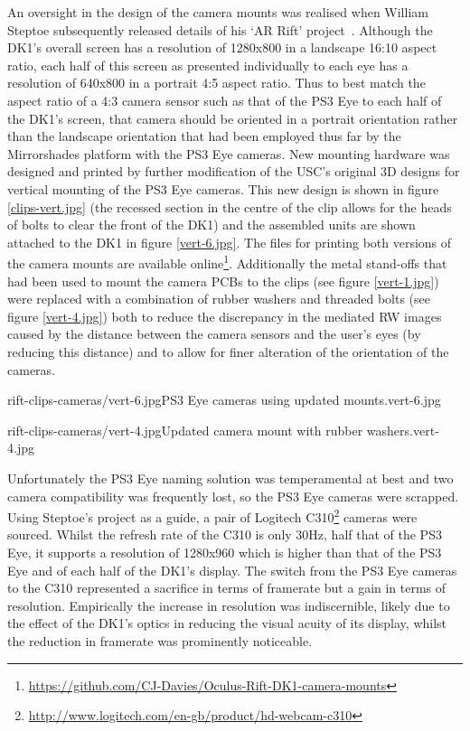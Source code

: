 An oversight in the design of the camera mounts was realised when William Steptoe subsequently released details of his `AR Rift' project~\cite{Steptoe2014}. Although the DK1's overall screen has a resolution of 1280x800 in a landscape 16:10 aspect ratio, each half of this screen as presented individually to each eye has a resolution of 640x800 in a portrait 4:5 aspect ratio. Thus to best match the aspect ratio of a 4:3 camera sensor such as that of the PS3 Eye to each half of the DK1's screen, that camera should be oriented in a portrait orientation rather than the landscape orientation that had been employed thus far by the Mirrorshades platform with the PS3 Eye cameras. New mounting hardware was designed and printed by further modification of the USC's original 3D designs for vertical mounting of the PS3 Eye cameras. This new design is shown in figure \ref{clips-vert.jpg} (the recessed section in the centre of the clip allows for the heads of bolts to clear the front of the DK1) and the assembled units are shown attached to the DK1 in figure \ref{vert-6.jpg}. The files for printing both versions of the camera mounts are available online\footnote{\url{https://github.com/CJ-Davies/Oculus-Rift-DK1-camera-mounts}}. Additionally the metal stand-offs that had been used to mount the camera PCBs to the clips (see figure \ref{vert-1.jpg}) were replaced with a combination of rubber washers and threaded bolts (see figure \ref{vert-4.jpg}) both to reduce the discrepancy in the mediated RW images caused by the distance between the camera sensors and the user's eyes (by reducing this distance) and to allow for finer alteration of the orientation of the cameras.

       {rift-clips-cameras/vert-6.jpg}{PS3 Eye cameras using updated mounts.}{vert-6.jpg}

       {rift-clips-cameras/vert-4.jpg}{Updated camera mount with rubber washers.}{vert-4.jpg}

Unfortunately the PS3 Eye naming solution was temperamental at best and two camera compatibility was frequently lost, so the PS3 Eye cameras were scrapped. Using Steptoe's project as a guide, a pair of Logitech C310\footnote{\url{http://www.logitech.com/en-gb/product/hd-webcam-c310}} cameras were sourced. Whilst the refresh rate of the C310 is only 30Hz, half that of the PS3 Eye, it supports a resolution of 1280x960 which is higher than that of the PS3 Eye and of each half of the DK1's display. The switch from the PS3 Eye cameras to the C310 represented a sacrifice in terms of framerate but a gain in terms of resolution. Empirically the increase in resolution was indiscernible, likely due to the effect of the DK1's optics in reducing the visual acuity of its display, whilst the reduction in framerate was prominently noticeable.

